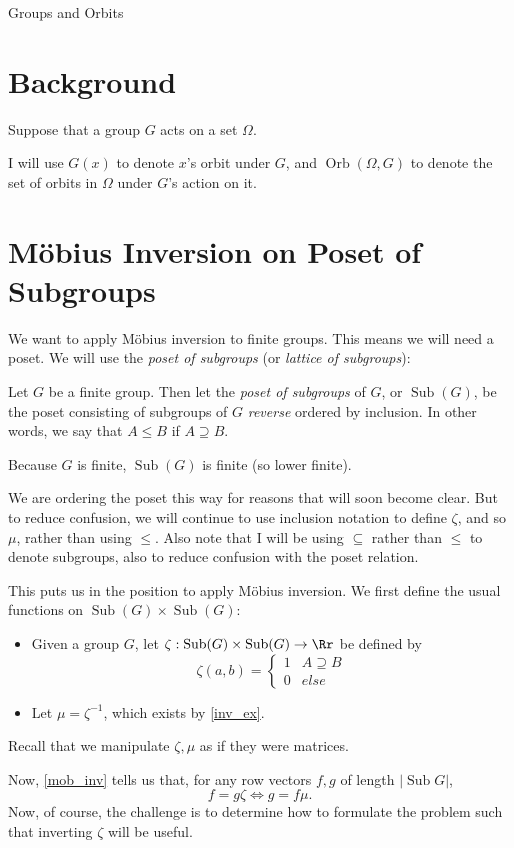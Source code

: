 \documentclass[12pt]{pom_thesis}
\DeclareMathOperator{\sub}{Sub}
\DeclareMathOperator{\orb}{Orb}
\begin{document}
\begin{chapter}{Groups and Orbits} 
\section{Background}
Suppose that a group $G$ acts on a set $\Omega$. 

I will use $G(x)$ to denote $x$'s orbit under $G$, and $\orb(\Omega, G)$ to denote the set of orbits in $\Omega$ under $G$'s action on it. 
\section{M\"obius Inversion on Poset of Subgroups}
We want to apply M\"obius inversion to finite groups. This means we will need a poset. We will use the \emph{poset of subgroups} (or \emph{lattice of subgroups}):
\begin{defn}
Let $G$ be a finite group. Then let the \textit{poset of subgroups} of $G$, or $\sub(G)$, be the poset consisting of subgroups of $G$ \emph{reverse} ordered by inclusion. In other words, we say that $A \leq B$ if $A \supseteq B$.
\end{defn}
\begin{rmk}
Because $G$ is finite, $\sub(G)$ is finite (so lower finite).
\end{rmk}
\begin{rmk}
We are ordering the poset this way for reasons that will soon become clear. But to reduce confusion, we will continue to use inclusion notation to define $\zeta$, and so $\mu$, rather than using $\leq$. Also note that I will be using $\subseteq$ rather than $\leq$ to denote subgroups, also to reduce confusion with the poset relation.
\end{rmk}
This puts us in the position to apply M\"obius inversion. We first define the usual functions on $\sub(G) \times \sub(G)$:
\begin{itemize}
\item Given a group $G$, let $\zeta:\sub(G) \times \sub(G) \rightarrow \Rr$ be defined by
\[
\zeta(a,b) = \begin{cases}
1 & A \supseteq B\\
0 & else
\end{cases}
\]
\item Let $\mu = \zeta^{-1}$, which exists by \ref{inv_ex}.
\end{itemize}
Recall that we manipulate $\zeta, \mu$ as if they were matrices.

Now, \ref{mob_inv} tells us that, for any row vectors $f,g$ of length $|\sub{G}|$, 
\[
f = g\zeta \iff g = f\mu.
\]
Now, of course, the challenge is to determine how to formulate the problem such that inverting $\zeta$ will be useful.

\end{chapter}
\end{document}
